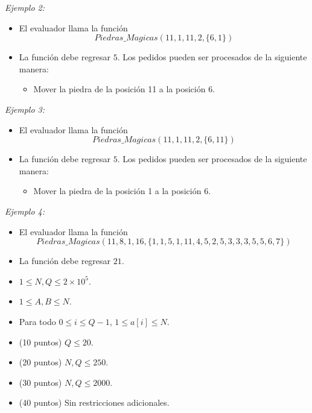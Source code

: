 \documentclass[12pt]{scrartcl}
\begin{document}
        {\itshape Ejemplo 2:}
        \begin{itemize}
            \item El evaluador llama la función $$Piedras\_Magicas(11, 1, 11, 2, \{6, 1\})$$
            \item La función debe regresar $5$. Los pedidos pueden ser procesados de la siguiente manera:
            \begin{itemize}
                \item Mover la piedra de la posición 11 a la posición 6.
            \end{itemize}
        \end{itemize}
        
        {\itshape Ejemplo 3:}
        \begin{itemize}
            \item El evaluador llama la función $$Piedras\_Magicas(11, 1, 11, 2, \{6, 11\})$$
            \item La función debe regresar $5$. Los pedidos pueden ser procesados de la siguiente manera:
            \begin{itemize}
                \item Mover la piedra de la posición 1 a la posición 6.
            \end{itemize}
        \end{itemize}
        
        {\itshape Ejemplo 4:}
        \begin{itemize}
            \item El evaluador llama la función $$Piedras\_Magicas(11, 8, 1, 16, \{1, 1, 5, 1, 11, 4, 5, 2, 5, 3, 3, 3, 5, 5, 6, 7\} )$$
            \item La función debe regresar $21$.
        \end{itemize}
        
        \begin{itemize}
            \item $1 \le  N, Q \le 2\times 10^5$.
            \item $1 \le A, B \le N$.
            \item Para todo $0 \le i \le Q - 1$, $1 \le a[i] \le N$.
        \end{itemize}
    

    \begin{itemize}
        \item (10 puntos) $Q \le 20$.
        \item (20 puntos) $N, Q \le 250$.
        \item (30 puntos) $N, Q \le 2000$.
        \item (40 puntos) Sin restricciones adicionales.
    \end{itemize}
\end{document}
